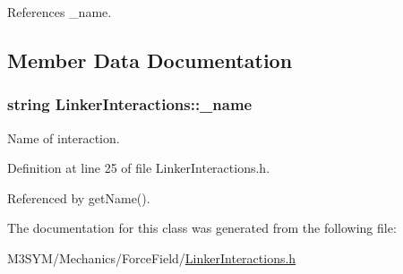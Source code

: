 References \+\_\+name.



\subsection{Member Data Documentation}
\hypertarget{classLinkerInteractions_af436c1bf2a53670f23849187c203d568}{
\subsubsection[{\+\_\+name}]{\setlength{\rightskip}{0pt plus 5cm}string Linker\+Interactions\+::\+\_\+name\hspace{0.3cm}{\ttfamily [private]}}}\label{classLinkerInteractions_af436c1bf2a53670f23849187c203d568}


Name of interaction. 



Definition at line 25 of file Linker\+Interactions.\+h.



Referenced by get\+Name().



The documentation for this class was generated from the following file\+:\begin{DoxyCompactItemize}
\item 
M3\+S\+Y\+M/\+Mechanics/\+Force\+Field/\hyperlink{LinkerInteractions_8h}{Linker\+Interactions.\+h}\end{DoxyCompactItemize}
